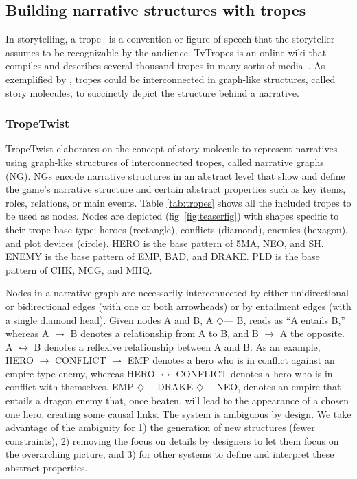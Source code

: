 \subsection{Building narrative structures with tropes}

In storytelling, a trope~\cite{p12tropesSimpsons} is a convention or figure of speech that the storyteller assumes to be recognizable by the audience. TvTropes is an online wiki that compiles and describes several thousand tropes in many sorts of media~\cite{p12tvtropes}. As exemplified by \cite{p12periodicTable}, tropes could be interconnected in graph-like structures, called story molecules, to succinctly depict the structure behind a narrative. 

\subsubsection{TropeTwist}

TropeTwist elaborates on the concept of story molecule to represent narratives using graph-like structures of interconnected tropes, called narrative graphs (NG). NGs encode narrative structures in an abstract level that show and define the game's narrative structure and certain abstract properties such as key items, roles, relations, or main events. Table \ref{tab:tropes} shows all the included tropes to be used as nodes. Nodes are depicted (fig~\ref{fig:teaserfig}) with shapes specific to their trope base type: heroes (rectangle), conflicts (diamond), enemies (hexagon), and plot devices (circle). HERO is the base pattern of 5MA, NEO, and SH. ENEMY is the base pattern of EMP, BAD, and DRAKE. PLD is the base pattern of CHK, MCG, and MHQ.

Nodes in a narrative graph are necessarily interconnected by either unidirectional or bidirectional edges (with one or both arrowheads) or by entailment edges (with a single diamond head). Given nodes A and B, A $\diamondsuit$--- B, reads as ``A entails B,'' whereas A $\rightarrow$ B denotes a relationship from A to B, and B $\rightarrow$ A the opposite. A $\leftrightarrow$ B denotes a reflexive relationship between A and B. As an example, HERO $\rightarrow$ CONFLICT $\rightarrow$ EMP denotes a hero who is in conflict against an empire-type enemy, whereas HERO $\leftrightarrow$ CONFLICT denotes a hero who is in conflict with themselves. EMP $\diamondsuit$--- DRAKE $\diamondsuit$--- NEO, denotes an empire that entails a dragon enemy that, once beaten, will lead to the appearance of a chosen one hero, creating some causal links. The system is ambiguous by design. We take advantage of the ambiguity for 1) the generation of new structures (fewer constraints), 2) removing the focus on details by designers to let them focus on the overarching picture, and 3) for other systems to define and interpret these abstract properties. 

